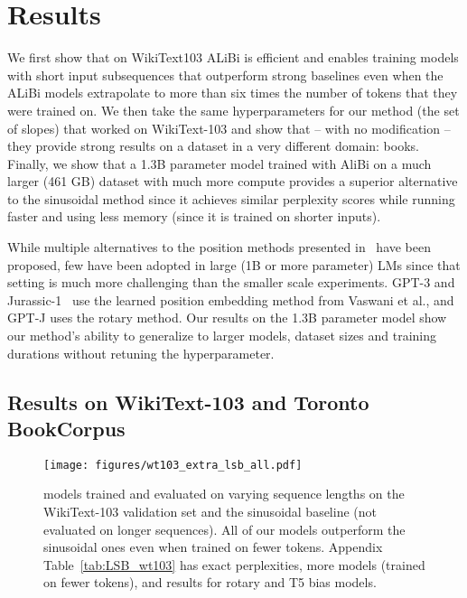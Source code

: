 \section{Results}
\label{sec:results}
We first show that on WikiText103 ALiBi is efficient and enables training models with short input subsequences that outperform strong baselines even when the ALiBi models extrapolate to more than six times the number of tokens that they were trained on. 
We then take the same hyperparameters for our method (the set of slopes) that worked on WikiText-103 and show that -- with no modification -- they provide strong results on a dataset in a very different domain: books. 
Finally, we show that a 1.3B parameter model trained with AliBi on a much larger (461 GB) dataset with much more compute provides a superior alternative to the sinusoidal method since it achieves similar perplexity scores while running faster and using less memory (since it is trained on shorter inputs). 

While multiple alternatives to the position methods presented in~\cite{vaswani} have been proposed, few have been adopted in large (1B or more parameter) LMs since  that setting is much more challenging than the smaller scale experiments. GPT-3 and Jurassic-1~\citep{J1WhitePaper} use the learned position embedding method from Vaswani et al., and GPT-J uses the rotary method.
Our results on the 1.3B parameter model show our method's ability to generalize to larger models, dataset sizes and training durations without retuning the hyperparameter. 

\subsection{Results on WikiText-103 and Toronto BookCorpus}

\begin{figure}[h]
\begin{center}
\texttt{[image: figures/wt103\_extra\_lsb\_all.pdf]} %
\end{center}
\caption{\al models trained and evaluated on varying sequence lengths on the WikiText-103 validation set and the sinusoidal baseline (not evaluated on longer sequences). All of our models outperform the sinusoidal ones even when trained on fewer tokens. Appendix Table~\ref{tab:LSB_wt103} has exact perplexities, more \al models (trained on fewer tokens), and results for rotary and T5 bias models. }
\label{fig:wt103_extra_lsb_all}
\end{figure}

